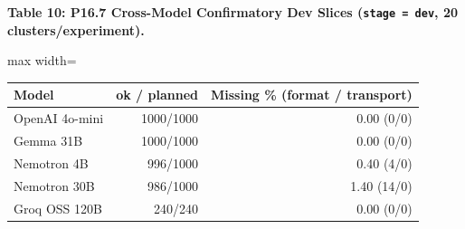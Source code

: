 \documentclass[11pt,a4paper]{article}
\begin{document}
\textbf{Table 10: P16.7 Cross-Model Confirmatory Dev Slices (\texttt{stage =\allowbreak{} dev}, 20 clusters/experiment).}

\begin{center}\begingroup\small\setlength{\tabcolsep}{4.5pt}\renewcommand{\arraystretch}{1.12}\begin{adjustbox}{max width=\textwidth}\begin{tabular}{lrr}\toprule
\textbf{Model} & \textbf{ok / planned} & \textbf{Missing \% (format / transport)} \\ \midrule
OpenAI 4o-mini & 1000/1000 & 0.00 (0/0) \\
Gemma 31B & 1000/1000 & 0.00 (0/0) \\
Nemotron 4B & 996/1000 & 0.40 (4/0) \\
Nemotron 30B & 986/1000 & 1.40 (14/0) \\
Groq OSS 120B & 240/240 & 0.00 (0/0) \\
\bottomrule\end{tabular}\end{adjustbox}\endgroup\end{center}
\end{document}
